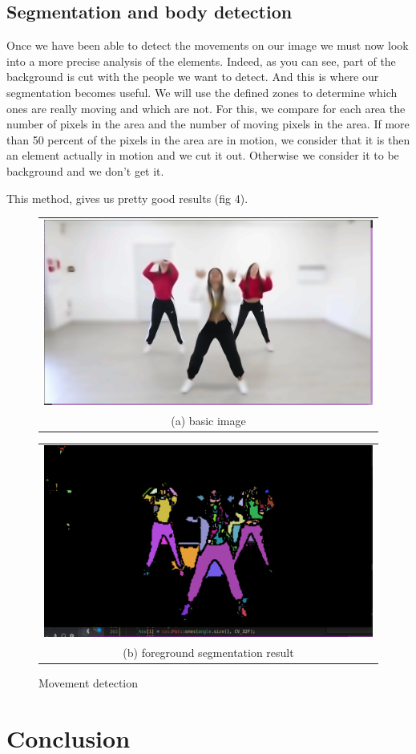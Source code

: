 \documentclass[conference]{IEEEtran}
\begin{document}
\subsection{Segmentation and body detection}

Once we have been able to detect the movements on our image we must now look into a more precise analysis of the elements. Indeed, as you can see, part of the background is cut with the people we want to detect. And this is where our segmentation becomes useful. We will use the defined zones to determine which ones are really moving and which are not. For this, we compare for each area the number of pixels in the area and the number of moving pixels in the area. If more than 50 percent of the pixels in the area are in motion, we consider that it is then an element actually in motion and we cut it out. Otherwise we consider it to be background and we don't get it. 

This method, gives us pretty good results (fig 4).

\begin{figure}[h!]
  \centering
  \begin{tabular}{@{}c@{}}
    \includegraphics[width=0.4\linewidth]{fig5.png} \\[\abovecaptionskip]
    \small (a) basic image
  \end{tabular}
  \begin{tabular}{@{}c@{}}
    \includegraphics[width=0.4\linewidth]{fig10.png} \\[\abovecaptionskip]
    \small (b) foreground segmentation result
  \end{tabular}
  \caption{Movement detection}
  \label{fig 3}
\end{figure}

\section{Conclusion}
\end{document}
